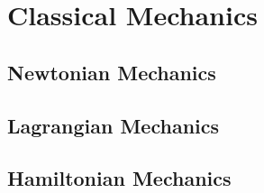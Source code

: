 \chapter{Classical Mechanics}

\section{Newtonian Mechanics}
\TODO

\section{Lagrangian Mechanics}
\TODO

\section{Hamiltonian Mechanics}
\TODO
